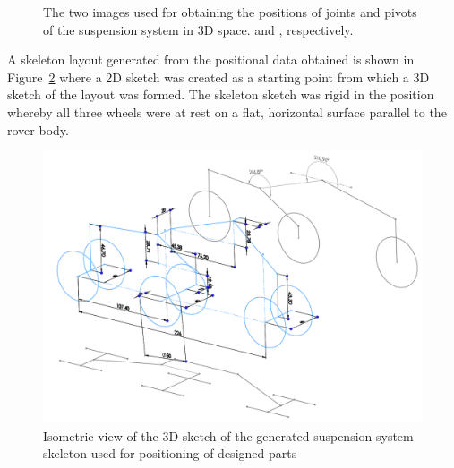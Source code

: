       \begin{figure}[h!]
      \centering
      \qquad
      \caption[The two images used for obtaining the positions of joints and pivots of the suspension system in 3D space]{The two images used for obtaining the positions of joints and pivots of the suspension system in 3D space. \cite{fig:mechDesign-suspensionReferences1_cite} and \cite{fig:mechDesign-suspensionReferences2_cite}, respectively.}
      \label{fig:mechDesign-suspensionReferences}
      \end{figure}

      A skeleton layout generated from the positional data obtained is shown in Figure~\ref{fig:mechDesign-suspension3d} where a 2D sketch was created as a starting point from which a 3D sketch of the layout was formed. The skeleton sketch was rigid in the position whereby all three wheels were at rest on a flat, horizontal surface parallel to the rover body.
            
      \begin{figure}[h!]
        \centering
        \includegraphics[width=0.9\linewidth]{figures/suspension3D}
        \caption[Isometric view of the 3D sketch of the generated suspension system skeleton used for positioning of designed parts]{Isometric view of the 3D sketch of the generated suspension system skeleton used for positioning of designed parts}
        \label{fig:mechDesign-suspension3d}
      \end{figure}
      
